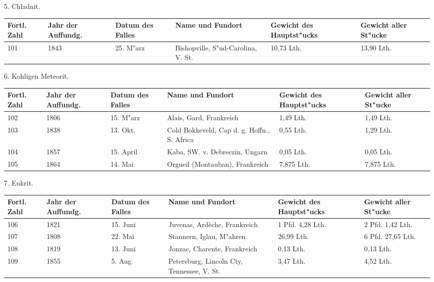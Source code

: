 \documentclass[a4paper, 11pt, oneside, german]{article}
\begin{document}
\clearpage
\begin{center}
5. Chladnit.
\end{center}
\begin{center}
\begin{footnotesize}
\begin{tabular}{ |p{7mm}|p{7mm}|p{13mm}|p{48mm}|p{22mm}|p{22mm}| }
    \hline
    Fortl. Zahl & Jahr der Auffundg. & Datum des Falles & Name und Fundort & Gewicht des Hauptst"ucks & Gewicht aller St"ucke\\
    \hline\hline
    101 & 1843 & 25. M"arz & Bishopville, S"ud-Carolina, V. St. & 10,73 Lth. & 13,90 Lth.\\
    \hline
\end{tabular}
\end{footnotesize}
\end{center}
\begin{center}
6. Kohligen Meteorit.
\end{center}
\begin{center}
\begin{footnotesize}
\begin{tabular}{ |p{7mm}|p{7mm}|p{13mm}|p{48mm}|p{22mm}|p{22mm}| }
    \hline
    Fortl. Zahl & Jahr der Auffundg. & Datum des Falles & Name und Fundort & Gewicht des Hauptst"ucks & Gewicht aller St"ucke\\
    \hline\hline
    102 & 1806 & 15. M"arz & Alais, Gard, Frankreich & 1,49 Lth. & 1,49 Lth.\\\hline
    103 & 1838 & 13. Okt. & Cold Bokkeveld, Cap d. g. Hoffn., S. Africa & 0,55 Lth. & 1,29 Lth.\\\hline
    104 & 1857 & 15. April & Kaba, SW. v. Debreczin, Ungarn & 0,05 Lth. & 0,05 Lth.\\\hline
    105 & 1864 & 14. Mai & Orgueil (Montauban), Frankreich & 7,875 Lth. & 7,875 Lth.\\
    \hline
\end{tabular}
\end{footnotesize}
\end{center}
\begin{center}
7. Eukrit.
\end{center}
\begin{center}
\begin{footnotesize}
\begin{tabular}{ |p{7mm}|p{7mm}|p{13mm}|p{48mm}|p{22mm}|p{22mm}| }
    \hline
    Fortl. Zahl & Jahr der Auffundg. & Datum des Falles & Name und Fundort & Gewicht des Hauptst"ucks & Gewicht aller St"ucke\\
    \hline\hline
    106 & 1821 & 15. Juni & Juvenas, Ardèche, Frankreich & 1 Pfd. 4,28 Lth. & 2 Pfd. 1,42 Lth.\\\hline
    107 & 1808 & 22. Mai & Stannern, Iglau, M"ahren & 26,99 Lth. & 6 Pfd. 27,65 Lth.\\\hline
    108 & 1819 & 13. Juni & Jonzac, Charente, Frankreich & 0,13 Lth. & 0,13 Lth.\\\hline
    109 & 1855 & 5. Aug. & Petersburg, Lincoln Cty, Tennessee, V. St. & 3,47 Lth. & 4,52 Lth.\\
    \hline
\end{tabular}
\end{footnotesize}
\end{center}
\end{document}
